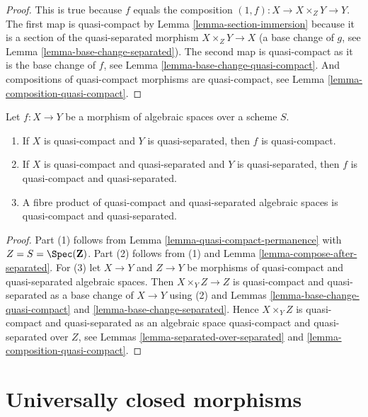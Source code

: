 \begin{proof}
This is true because $f$ equals the composition
$(1, f) : X \to X \times_Z Y \to Y$. The first map
is quasi-compact by Lemma \ref{lemma-section-immersion}
because it is a section of the quasi-separated morphism $X \times_Z Y \to X$
(a base change of $g$, see Lemma \ref{lemma-base-change-separated}).
The second map is quasi-compact as it
is the base change of $f$, see
Lemma \ref{lemma-base-change-quasi-compact}.
And compositions of quasi-compact
morphisms are quasi-compact, see Lemma \ref{lemma-composition-quasi-compact}.
\end{proof}

\begin{lemma}
\label{lemma-quasi-compact-quasi-separated-permanence}
Let $f : X \to Y$ be a morphism of algebraic spaces
over a scheme $S$.
\begin{enumerate}
\item If $X$ is quasi-compact and $Y$ is quasi-separated, then $f$ is
quasi-compact.
\item If $X$ is quasi-compact and quasi-separated and $Y$ is quasi-separated,
then $f$ is quasi-compact and quasi-separated.
\item A fibre product of quasi-compact and quasi-separated algebraic spaces
is quasi-compact and quasi-separated.
\end{enumerate}
\end{lemma}

\begin{proof}
Part (1) follows from
Lemma \ref{lemma-quasi-compact-permanence}
with $Z = S = \Spec(\mathbf{Z})$.
Part (2) follows from (1) and
Lemma \ref{lemma-compose-after-separated}.
For (3) let $X \to Y$ and $Z \to Y$ be morphisms
of quasi-compact and quasi-separated algebraic spaces. Then
$X \times_Y Z \to Z$ is quasi-compact and quasi-separated as a
base change of $X \to Y$ using (2) and
Lemmas \ref{lemma-base-change-quasi-compact} and
\ref{lemma-base-change-separated}.
Hence $X \times_Y Z$ is quasi-compact and quasi-separated as
an algebraic space quasi-compact and quasi-separated over
$Z$, see
Lemmas \ref{lemma-separated-over-separated} and
\ref{lemma-composition-quasi-compact}.
\end{proof}


\section{Universally closed morphisms}
\label{section-universally-closed}


